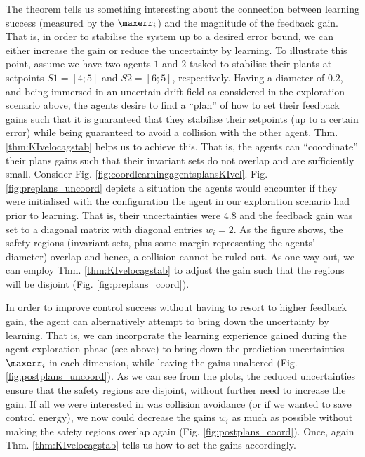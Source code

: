  
The theorem tells us something interesting about the connection between learning success (measured by the $\maxerr_i$) and the magnitude of the feedback gain. That is, in order to stabilise the system up to a desired error bound, we can either increase the gain or reduce the uncertainty by learning. To illustrate this point, assume we have two agents $1$ and $2$ tasked to stabilise their plants at setpoints $S1=[4;5]$ and $S2=[6;5]$, respectively. Having a diameter of $0.2$, and being immersed in an uncertain drift field as considered in the exploration scenario above, the agents desire to find a ``plan'' of how to set their feedback gains such that it is guaranteed that they stabilise their setpoints (up to a certain error) while being guaranteed to avoid a collision with the other agent. Thm. \ref{thm:KIvelocagstab} helps us to achieve this.  That is, the agents can ``coordinate'' their plans gains such that their invariant sets do not overlap and are sufficiently small. 
Consider Fig. \ref{fig:coordlearningagentsplansKIvel}. 
Fig. \ref{fig:preplans_uncoord} depicts a situation the agents would encounter if they were initialised with the configuration the agent in our exploration scenario had prior to learning. That is, their uncertainties were $4.8$ and the feedback gain was set to a diagonal matrix with diagonal entries $w_i =2$. As the figure shows, the safety regions (invariant sets, plus some margin representing the agents' diameter) overlap and hence, a collision cannot be ruled out. As one way out, we can employ Thm. \ref{thm:KIvelocagstab} to adjust the gain such that the regions will be disjoint (Fig. \ref{fig:preplans_coord}). 

In order to improve control success without having to resort to higher feedback gain, the agent can alternatively attempt to bring down the uncertainty by learning. That is, we can incorporate the learning experience gained during the agent exploration phase (see above) to bring down the prediction uncertainties $\maxerr_i$ in each dimension, while leaving the gains unaltered (Fig. \ref{fig:postplans_uncoord}).
As we can see from the plots, the reduced uncertainties ensure that the safety regions are disjoint, without further need to increase the gain.
If all we were interested in was collision avoidance (or if we wanted to save control energy), we now could decrease the gains $w_i$ as much as possible without making the safety regions overlap again (Fig. \ref{fig:postplans_coord}). Once, again Thm. \ref{thm:KIvelocagstab} tells us how to set the gains accordingly. 


